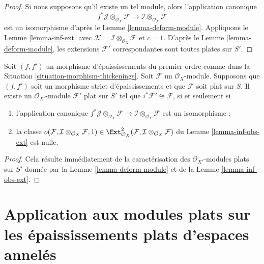 \begin{proof}
Si nous supposons qu'il existe un tel module, alors l'application canonique
$$
f^*\mathcal{J} \otimes_{\mathcal{O}_X} \mathcal{F} \to
\mathcal{I} \otimes_{\mathcal{O}_X} \mathcal{F}
$$
est un isomorphisme d'après le Lemme \ref{lemma-deform-module}. Appliquons le
Lemme \ref{lemma-inf-ext} avec $\mathcal{K} = 
\mathcal{I} \otimes_{\mathcal{O}_X} \mathcal{F}$
et $c = 1$. D'après le Lemme \ref{lemma-deform-module}, les extensions
$\mathcal{F}'$ correspondantes sont toutes plates sur $S'$.
\end{proof}

\begin{lemma}
\label{lemma-inf-obs-ext-rel}
Soit $(f, f')$ un morphisme d'épaississements du premier ordre comme dans la
Situation \ref{situation-morphism-thickenings}.
Soit $\mathcal{F}$ un $\mathcal{O}_X$-module. Supposons que
$(f, f')$ soit un morphisme strict d'épaississements
et que $\mathcal{F}$ soit plat sur $S$. Il existe un
$\mathcal{O}_{X'}$-module $\mathcal{F}'$ plat sur $S'$ tel que
$i^*\mathcal{F}' \cong \mathcal{F}$, si et seulement si
\begin{enumerate}
\item l'application canonique $
f^*\mathcal{J} \otimes_{\mathcal{O}_X} \mathcal{F} \to
\mathcal{I} \otimes_{\mathcal{O}_X} \mathcal{F}$
est un isomorphisme ;
\item la classe
$o(\mathcal{F}, \mathcal{I} \otimes_{\mathcal{O}_X} \mathcal{F}, 1)
\in \Ext^2_{\mathcal{O}_X}(
\mathcal{F}, \mathcal{I} \otimes_{\mathcal{O}_X} \mathcal{F})$
du Lemme \ref{lemma-inf-obs-ext} est nulle.
\end{enumerate}
\end{lemma}

\begin{proof}
Cela résulte immédiatement de la caractérisation des
$\mathcal{O}_{X'}$-modules plats sur $S'$ donnée par la
Lemme \ref{lemma-deform-module} et de la
Lemme \ref{lemma-inf-obs-ext}.
\end{proof}






\section{Application aux modules plats sur les épaississements plats d'espaces annelés}
\label{section-flat}

